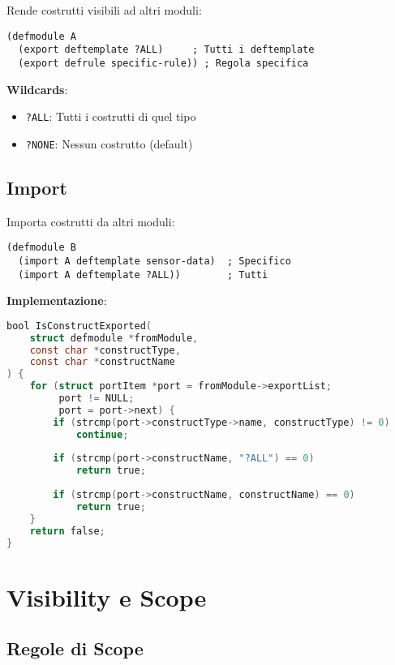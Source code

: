 Rende costrutti visibili ad altri moduli:

\begin{lstlisting}[language=CLIPS]
(defmodule A
  (export deftemplate ?ALL)     ; Tutti i deftemplate
  (export defrule specific-rule)) ; Regola specifica
\end{lstlisting}

\textbf{Wildcards}:
\begin{itemize}
\item \texttt{?ALL}: Tutti i costrutti di quel tipo
\item \texttt{?NONE}: Nessun costrutto (default)
\end{itemize}

\subsection{Import}

Importa costrutti da altri moduli:

\begin{lstlisting}[language=CLIPS]
(defmodule B
  (import A deftemplate sensor-data)  ; Specifico
  (import A deftemplate ?ALL))        ; Tutti
\end{lstlisting}

\textbf{Implementazione}:

\begin{lstlisting}[language=C]
bool IsConstructExported(
    struct defmodule *fromModule,
    const char *constructType,
    const char *constructName
) {
    for (struct portItem *port = fromModule->exportList;
         port != NULL;
         port = port->next) {
        if (strcmp(port->constructType->name, constructType) != 0)
            continue;
        
        if (strcmp(port->constructName, "?ALL") == 0)
            return true;
        
        if (strcmp(port->constructName, constructName) == 0)
            return true;
    }
    return false;
}
\end{lstlisting}

\section{Visibility e Scope}

\subsection{Regole di Scope}


